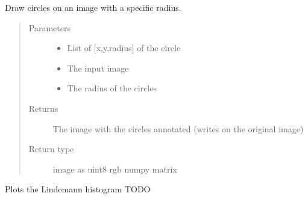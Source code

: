 \documentclass[letterpaper,10pt,english]{sphinxmanual}
\begin{document}
\begin{fulllineitems}
\label{\detokenize{index:mlpy.plots.draw_circles}}
Draw circles on an image with a specific radius.
\begin{quote}\begin{description}
\item[{Parameters}] \leavevmode\begin{itemize}
\item {} 
 \textendash{} List of {[}x,y,radius{]} of the circle

\item {} 
 \textendash{} The input image

\item {} 
 \textendash{} The radius of the circles

\end{itemize}

\item[{Returns}] \leavevmode
The image with the circles annotated (writes on the original image)

\item[{Return type}] \leavevmode
image as uint8 rgb numpy matrix

\end{description}\end{quote}

\end{fulllineitems}


\begin{fulllineitems}
\label{\detokenize{index:mlpy.plots.plot_lindemann_histogram}}
Plots the Lindemann histogram TODO

\end{fulllineitems}

\label{\detokenize{index:module-mlpy.detection}}
\end{document}
